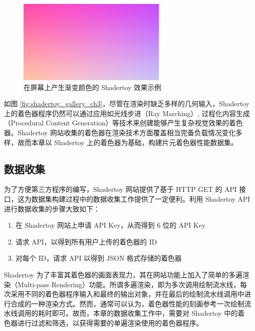 \begin{figure}
  \centering
  \includegraphics[width=0.65\textwidth]{figures/example_shadertoy_output.png}
  \caption{在屏幕上产生渐变颜色的 Shadertoy 效果示例}
  \label{fig:example_shadertoy_output_ch3}
\end{figure}

如图 \ref{fig:shadertoy_gallery_ch3}，尽管在渲染时缺乏多样的几何输入，{\amend Shadertoy 上的着色器程序}仍然可以通过应用如光线步进（Ray Marching）\cite{Hart1996}, 过程化内容生成（Procedural Content Generation）等技术来创建能够产生复杂视觉效果的着色器。Shadertoy 网站收集的着色器在渲染技术方面覆盖相当完备{\amend 负载情况变化多样}，故而{\amend 本章}以 Shadertoy 上的着色器为基础，构建片元着色器性能数据集。

\subsection{数据收集}

为了方便第三方程序的编写，Shadertoy 网站提供了基于 HTTP GET 的 API 接口，这为{\amend 数据集构建过程中的}数据收集工作提供了一定便利。利用 Shadertoy API 进行数据收集的步骤大致如下：

\begin{enumerate}
    \item 在 Shadertoy 网站上申请 API Key，从而得到 6 位的 API Key
    \item 请求 API，以得到所有用户上传的着色器的 ID
    \item 对每个 ID，请求 API 以得到 JSON 格式存储的着色器
\end{enumerate}

{\amend Shadertoy 为了丰富其着色器的画面表现力，其在网站功能上加入了简单的多遍渲染（Multi-pass Rendering）功能。所谓多遍渲染，即为多次调用绘制流水线，每次采用不同的着色器程序输入和最终的输出对象，并在最后的绘制流水线调用中进行合成的一种渲染方式。然而，通常可以认为，着色器性能的刻画参考一次绘制流水线调用的耗时即可。故而，本章的数据收集工作中，需要对 Shadertoy 中的着色器进行过滤和筛选，以获得需要的单遍渲染使用的着色器程序。}

